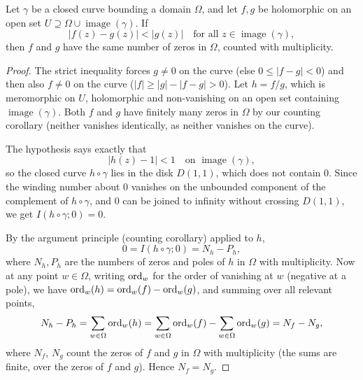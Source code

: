 \documentclass[a4paper]{scrartcl}
\begin{document}
\begin{center}
\end{center}

\begin{theorem}
    Let $\gamma$ be a closed curve bounding a domain $\Omega$, and let $f, g$ be holomorphic on an open set $U \supseteq \Omega \cup \operatorname{image}(\gamma)$. If
    $$
    |f(z) - g(z)| < |g(z)| \quad \text{for all } z \in \operatorname{image}(\gamma),
    $$
    then $f$ and $g$ have the same number of zeros in $\Omega$, counted with multiplicity.
\end{theorem}
\begin{proof}
    The strict inequality forces $g \neq 0$ on the curve (else $0 \leq |f - g| < 0$) and then also $f \neq 0$ on the curve ($|f| \geq |g| - |f - g| > 0$). Let $h = f/g$, which is meromorphic on $U$, holomorphic and non-vanishing on an open set containing $\operatorname{image}(\gamma)$. Both $f$ and $g$ have finitely many zeros in $\Omega$ by our counting corollary (neither vanishes identically, as neither vanishes on the curve).

    The hypothesis says exactly that
    $$
    |h(z) - 1| < 1 \quad \text{on } \operatorname{image}(\gamma),
    $$
    so the closed curve $h \circ \gamma$ lies in the disk $D(1, 1)$, which does not contain $0$. Since the winding number about $0$ vanishes on the unbounded component of the complement of $h \circ \gamma$, and $0$ can be joined to infinity without crossing $D(1, 1)$, we get $I(h \circ \gamma; 0) = 0$.

    By the argument principle (counting corollary) applied to $h$,
    $$
    0 = I(h \circ \gamma; 0) = N_h - P_h,
    $$
    where $N_h, P_h$ are the numbers of zeros and poles of $h$ in $\Omega$ with multiplicity. Now at any point $w \in \Omega$, writing $\operatorname{ord}_w$ for the order of vanishing at $w$ (negative at a pole), we have $\operatorname{ord}_w(h) = \operatorname{ord}_w(f) - \operatorname{ord}_w(g)$, and summing over all relevant points,
    $$
    N_h - P_h = \sum_{w \in \Omega} \operatorname{ord}_w(h) = \sum_{w \in \Omega} \operatorname{ord}_w(f) - \sum_{w \in \Omega} \operatorname{ord}_w(g) = N_f - N_g,
    $$
    where $N_f$, $N_g$ count the zeros of $f$ and $g$ in $\Omega$ with multiplicity (the sums are finite, over the zeros of $f$ and $g$). Hence $N_f = N_g$.
\end{proof}
\end{document}
